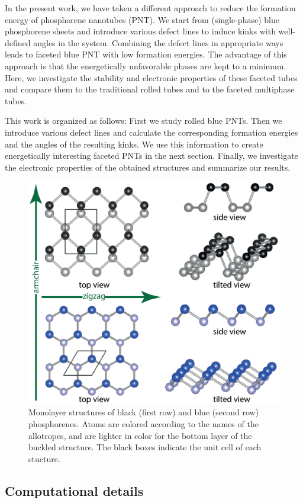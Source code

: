 In the present work, we have taken a different approach to reduce the formation energy of phosphorene nanotubes (PNT). We start from (single-phase) blue phosphorene sheets and introduce various defect lines to induce kinks with well-defined angles in the system. Combining the defect lines in appropriate ways leads to faceted blue PNT with low formation energies. The advantage of this approach is that the energetically unfavorable phases are kept to a minimum. Here, we investigate the stability and electronic properties of these faceted tubes and compare them to the traditional rolled tubes and to the faceted multiphase tubes. 

This work is organized as follows: First we study rolled blue PNTs. Then we introduce various defect lines and calculate the corresponding formation energies and the angles of the resulting kinks. We use this information to create energetically interesting faceted PNTs in the next section. Finally, we investigate the electronic properties of the obtained structures and summarize our results.


\begin{figure}[htb]
\centering
\includegraphics[width=0.7\linewidth]{Nanotu_monolayer_structures.eps}%
\caption{Monolayer structures of black (first row) and blue (second row) phosphorenes. Atoms are colored according to the names of the allotropes, and are lighter in color for the bottom layer of the buckled structure. The black boxes indicate the unit cell of each stucture. \label{natu_monolayer}}
\end{figure}

\subsection{Computational details}

